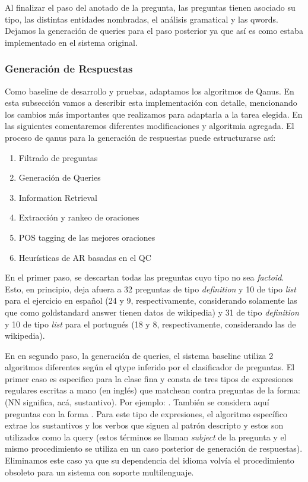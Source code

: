 Al finalizar el paso del anotado de la pregunta, las preguntas tienen asociado su tipo, las distintas entidades nombradas, el análisis gramatical y las qwords. Dejamos la generación de queries para el paso posterior ya que así es como estaba implementado en el sistema original.

\subsubsection{Generación de Respuestas}

Como baseline de desarrollo y pruebas, adaptamos los algoritmos de Qanus. En esta subsección vamos a describir esta implementación con detalle, mencionando los cambios más importantes que realizamos para adaptarla a la tarea elegida. En las siguientes comentaremos diferentes modificaciones y algoritmia agregada. El proceso de qanus para la generación de respuestas puede estructurarse así:
\begin{enumerate}
  \item Filtrado de preguntas
  \item Generación de Queries
  \item Information Retrieval
  \item Extracción y rankeo de oraciones
  \item POS tagging de las mejores oraciones
  \item Heurísticas de AR basadas en el QC
\end{enumerate}

En el primer paso, se descartan todas las preguntas cuyo tipo no sea \textit{factoid}. Esto, en principio, deja afuera a 32 preguntas de tipo \textit{definition} y 10 de tipo \textit{list} para el ejercicio en español (24 y 9, respectivamente, considerando solamente las que como goldstandard answer tienen datos de wikipedia) y 31 de tipo \textit{definition} y 10 de tipo \textit{list} para el portugués (18 y 8, respectivamente, considerando las de wikipedia).

En en segundo paso, la generación de queries, el sistema baseline utiliza 2 algoritmos diferentes según el qtype inferido por el clasificador de preguntas. El primer caso es especifico para la clase fina  y consta de tres tipos de expresiones regulares escritas a mano (en inglés) que matchean contra preguntas de la forma:  (NN significa, acá, sustantivo). Por ejemplo: . También se considera aquí preguntas con la forma . Para este tipo de expresiones, el algoritmo específico extrae los sustantivos y los verbos que siguen al patrón descripto y estos son utilizados como la query (estos términos se llaman \textit{subject} de la pregunta y el mismo procedimiento se utiliza en un caso posterior de generación de respuestas). Eliminamos este caso ya que su dependencia del idioma volvía el procedimiento obsoleto para un sistema con soporte multilenguaje.

